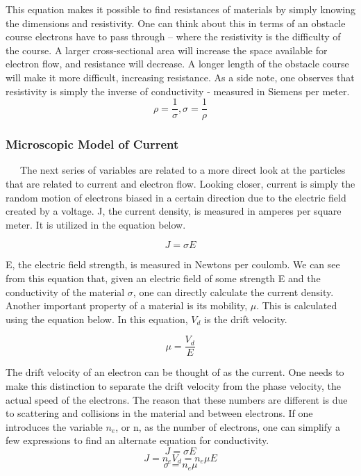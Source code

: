 \documentclass[11pt]{article}
\begin{document}
This equation makes it possible to find resistances of materials by simply knowing the dimensions and resistivity. One can think about this in terms of an obstacle course electrons have to pass through – where the resistivity is the difficulty of the course. A larger cross-sectional area will increase the space available for electron flow, and resistance will decrease. A longer length of the obstacle course will make it more difficult, increasing resistance. As a side note, one observes that resistivity is simply the inverse of conductivity - measured in Siemens per meter.
\begin{equation}
\rho = \frac{1}{\sigma}, \sigma = \frac{1}{\rho}
\end{equation}

\subsubsection*{Microscopic Model of Current}
\ \ \ The next series of variables are related to a more direct look at the particles that are related to current and electron flow. Looking closer, current is simply the random motion of electrons biased in a certain direction due to the electric field created by a voltage. J, the current density, is measured in amperes per square meter. It is utilized in the equation below.

\begin{equation}
J = \sigma E
\end{equation}

E, the electric field strength, is measured in Newtons per coulomb. We can see from this equation that, given an electric field of some strength E and the conductivity of the material $\sigma$, one can directly calculate the current density.\\

Another important property of a material is its mobility, $\mu$. This is calculated using the equation below. In this equation, $V_d$ is the drift velocity.

\begin{equation}
\mu = \frac{V_d}{E}
\end{equation}

The drift velocity of an electron can be thought of as the current. One needs to make this distinction to separate the drift velocity from the phase velocity, the actual speed of the electrons. The reason that these numbers are different is due to scattering and collisions in the material and between electrons. If one introduces the variable $n_e$, or n, as the number of electrons, one can simplify a few expressions to find an alternate equation for conductivity.
$$J = \sigma E$$
$$J = n_e V_d = n_e \mu E$$
\begin{equation}
\sigma = n_e \mu
\end{equation}
\end{document}
